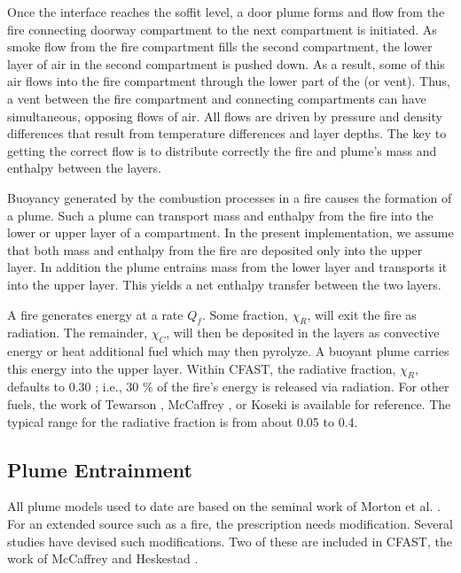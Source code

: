 Once the interface reaches the soffit level, a door plume forms and flow from the fire connecting doorway compartment to the next compartment is initiated.  As smoke flow from the fire compartment fills the second compartment, the lower layer of air in the second compartment is pushed down. As a result, some of this air flows into the fire compartment through the lower part of the (or vent).  Thus, a vent between the fire compartment and connecting compartments can have simultaneous, opposing flows of air.  All flows are driven by pressure and density differences that result from temperature differences and layer depths. The key to getting the correct flow is to distribute correctly the fire and plume's mass and enthalpy between the layers.

Buoyancy generated by the combustion processes in a fire causes the formation of a plume. Such a plume can transport mass and enthalpy from the fire into the lower or upper layer of a compartment.  In the present implementation, we assume that both mass and enthalpy from the fire are deposited only into the upper layer.  In addition the plume entrains mass from the lower layer and transports it into the upper layer.  This yields a net enthalpy transfer between the two layers.

A fire generates energy at a rate $Q_f$.  Some fraction, $\chi_R$, will exit the fire as radiation.  The remainder, $\chi_C$, will then be deposited in the layers as convective energy or heat additional fuel which may then pyrolyze. A buoyant plume carries this energy into the upper layer. Within CFAST, the radiative fraction, $\chi_R$, defaults to 0.30 \cite{Drysdale:1985}; i.e., 30 \% of the fire's energy is released via radiation.  For other fuels, the work of Tewarson \cite{Tewarson:1978}, McCaffrey \cite{McCaffrey:1982}, or Koseki \cite{Koseki:1989} is available for reference.  The typical range for the radiative fraction is from about 0.05 to 0.4.

\subsection{Plume Entrainment}

All plume models used to date are based on the seminal work of Morton et al. \cite{Morton:1956}. For an extended source such as a fire, the prescription needs modification. Several studies have devised such modifications. Two of these are included in CFAST, the work of McCaffrey \cite{McCaffrey:1983} and Heskestad \cite{Heskestad:1984}.

